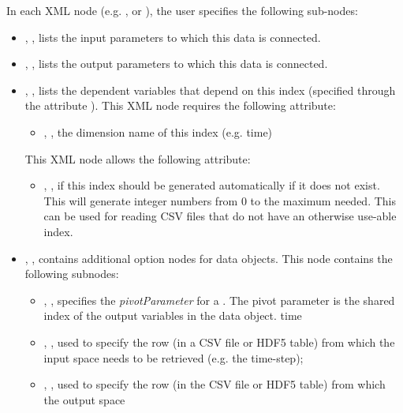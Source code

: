 \vspace{-5mm}
In each XML node (e.g. ,  or  ), the user
specifies the following sub-nodes:
\begin{itemize}
  \item {}, , lists
  the input parameters to which this data is connected.
  \item {}, , lists
  the output parameters to which this data is connected.
  \item {}, , lists
  the dependent variables that depend on this index (specified through the attribute  ).
  This XML node requires the following attribute:
   \begin{itemize}
     \item {}, , the dimension name of this index (e.g. time)
   \end{itemize}
   This XML node allows the following attribute:
   \begin{itemize}
     \item {}, , if this index should be generated automatically if it does not exist. This will generate integer numbers from 0 to the maximum needed. This can be used for reading CSV files that do not have an otherwise use-able index.
   \end{itemize}
 \item {}, , contains additional option nodes
   for data objects.  This node contains the following subnodes:
   \begin{itemize}
     \item {}, , specifies the \textit{pivotParameter} for a
       . The pivot parameter is the shared index of the output variables in the data
       object.   time
    \item {}, , used to
         specify  the row (in a CSV file or HDF5 table) from which the input space
        needs to be retrieved (e.g. the time-step);
    \item {}, , used to
         specify  the row (in the CSV file or HDF5 table) from which the output space

\end{itemize}
\end{itemize}

